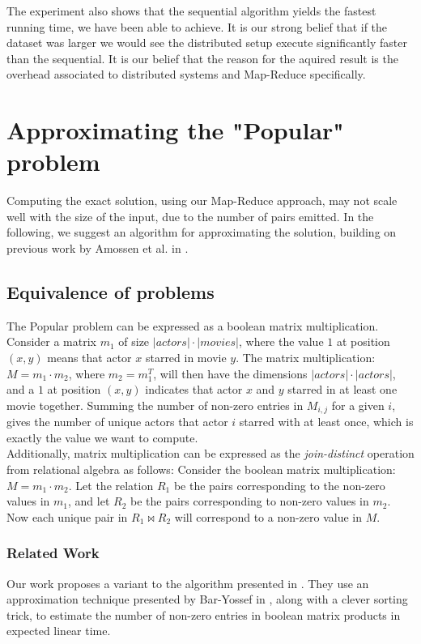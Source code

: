 \documentclass[a4paper,11pt]{article}
\begin{document}
The experiment also shows that the sequential algorithm yields the fastest running time, we have been able to achieve. 
It is our strong belief that if the dataset was larger we would see the distributed setup execute significantly faster than the sequential. It is our belief that the reason for the aquired result is the overhead associated to distributed systems and Map-Reduce specifically.

\section{Approximating the "Popular" problem}
Computing the exact solution, using our Map-Reduce approach, may not scale well with the size of the input, due to the number of pairs emitted. In the following, we suggest an algorithm for approximating the solution, building on previous work by Amossen et al. in \cite{paper:amossen}.

\subsection{Equivalence of problems}
The Popular problem can be expressed as a boolean matrix multiplication. Consider a matrix $m_1$ of size $|actors| \cdot |movies|$, where the value $1$ at position $(x, y)$ means that actor $x$ starred in movie $y$. The matrix multiplication: $M = m_1 \cdot m_2$, where $m_2 = m_1^T$, will then have the dimensions $|actors| \cdot |actors|$, and a $1$ at position $(x, y)$ indicates that actor $x$ and $y$ starred in at least one movie together. Summing the number of non-zero entries in $M_{i,j}$ for a given $i$, gives the number of unique actors that actor $i$ starred with at least once, which is exactly the value we want to compute.\\
Additionally, matrix multiplication can be expressed as the \emph{join-distinct} operation from relational algebra as follows: Consider the boolean matrix multiplication: $M = m_1 \cdot m_2$. Let the relation $R_1$ be the pairs corresponding to the non-zero values in $m_1$, and let $R_2$ be the pairs corresponding to non-zero values in $m_2$. Now each unique pair in $R_1 \Join R_2$ will correspond to a non-zero value in $M$.

\subsubsection{Related Work}
Our work proposes a variant to the algorithm presented in \cite{paper:amossen}. They use an approximation technique presented by Bar-Yossef in \cite{paper:bar-yos}, along with a clever sorting trick, to estimate the number of non-zero entries in boolean matrix products in expected linear time. 
\end{document}
